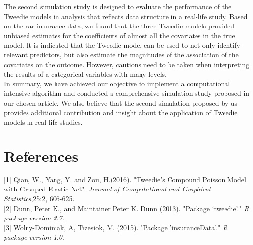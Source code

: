 \documentclass[paper=a4, fontsize=11pt]{scrartcl} %
\begin{document}
The second simulation study is designed to evaluate the performance of the Tweedie models in analysis that reflects data structure in a real-life study. Based on the car insurance data, we found that the three Tweedie models provided unbiased estimates for the coefficients of almost all the covariates in the true model. It is indicated that the Tweedie model can be used to not only identify relevant predictors, but also estimate the magnitudes of the association of the covariates on the outcome. However, cautions need to be taken when interpreting the results of a categorical variables with many levels.\\

In summary, we have achieved our objective to implement a computational intensive algorithm and conducted a comprehensive simulation study proposed in our chosen article. We also believe that the second simulation proposed by us provides additional contribution and insight about the application of Tweedie models in real-life studies.\\
\newpage
\section*{\textbf{References}}
[1] Qian, W., Yang, Y. and Zou, H.(2016). "Tweedie's Compound Poisson Model with Grouped Elastic Net". \emph{Journal of Computational and Graphical Statistics},25:2, 606-625.\\

[2] Dunn, Peter K., and Maintainer Peter K. Dunn (2013). "Package ‘tweedie’." \emph{R package version 2.7}.\\

[3] Wolny-Dominiak, A, Trzesiok, M. (2015). "Package 'insuranceData'." \emph{R package version 1.0}.\\
\end{document}
